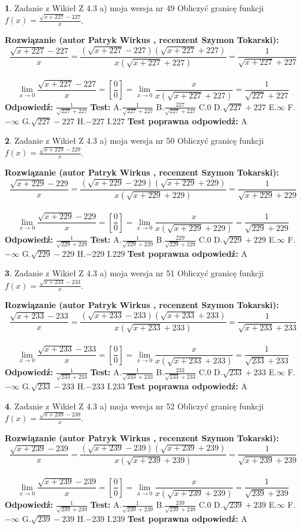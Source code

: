 \documentclass[12pt, a4paper]{article}
\theoremstyle{definition} %
\newtheorem{zad}{}
\newcommand{\zadStart}[1]{\begin{zad}#1\newline}
\newcommand{\zadStop}{\end{zad}}
\newcommand{\rozwStart}[2]{\noindent \textbf{Rozwiązanie (autor #1 , recenzent #2): }\newline}
\newcommand{\rozwStop}{\newline}
\newcommand{\odpStart}{\noindent \textbf{Odpowiedź:}\newline}
\newcommand{\odpStop}{\newline}
\newcommand{\testStart}{\noindent \textbf{Test:}\newline}
\newcommand{\testStop}{\newline}
\newcommand{\kluczStart}{\noindent \textbf{Test poprawna odpowiedź:}\newline}
\newcommand{\kluczStop}{\newline}
\begin{document}
\zadStart{Zadanie z Wikieł Z 4.3 a) moja wersja nr 49}
Obliczyć granicę funkcji $f(x)=\frac{\sqrt{x+227}-227}{x}$.
\zadStop
\rozwStart{Patryk Wirkus}{Szymon Tokarski}
$$\frac{\sqrt{x+227}-227}{x}=\frac{(\sqrt{x+227}-227)(\sqrt{x+227}+227)}{x(\sqrt{x+227}+227)}=\frac{1}{\sqrt{x+227}+227}$$
\\
$$\lim\limits_{x\to0}\frac{\sqrt{x+227}-227}{x}=[\frac{0}{0}]=
\lim\limits_{x\to0}\frac{x}{x(\sqrt{x+227}+227)} = \frac{1}{\sqrt{227}+227}$$
\rozwStop
\odpStart
$\frac{1}{\sqrt{227}+227}$
\odpStop
\testStart
A.$\frac{1}{\sqrt{227}+227}$
B.$\frac{227}{\sqrt{227}+227}$
C.$0$
D.$\sqrt{227}+227$
E.$\infty$
F.$-\infty$
G.$\sqrt{227}-227$
H.$-227$
I.$227$
\testStop
\kluczStart
A
\kluczStop



\zadStart{Zadanie z Wikieł Z 4.3 a) moja wersja nr 50}
Obliczyć granicę funkcji $f(x)=\frac{\sqrt{x+229}-229}{x}$.
\zadStop
\rozwStart{Patryk Wirkus}{Szymon Tokarski}
$$\frac{\sqrt{x+229}-229}{x}=\frac{(\sqrt{x+229}-229)(\sqrt{x+229}+229)}{x(\sqrt{x+229}+229)}=\frac{1}{\sqrt{x+229}+229}$$
\\
$$\lim\limits_{x\to0}\frac{\sqrt{x+229}-229}{x}=[\frac{0}{0}]=
\lim\limits_{x\to0}\frac{x}{x(\sqrt{x+229}+229)} = \frac{1}{\sqrt{229}+229}$$
\rozwStop
\odpStart
$\frac{1}{\sqrt{229}+229}$
\odpStop
\testStart
A.$\frac{1}{\sqrt{229}+229}$
B.$\frac{229}{\sqrt{229}+229}$
C.$0$
D.$\sqrt{229}+229$
E.$\infty$
F.$-\infty$
G.$\sqrt{229}-229$
H.$-229$
I.$229$
\testStop
\kluczStart
A
\kluczStop



\zadStart{Zadanie z Wikieł Z 4.3 a) moja wersja nr 51}
Obliczyć granicę funkcji $f(x)=\frac{\sqrt{x+233}-233}{x}$.
\zadStop
\rozwStart{Patryk Wirkus}{Szymon Tokarski}
$$\frac{\sqrt{x+233}-233}{x}=\frac{(\sqrt{x+233}-233)(\sqrt{x+233}+233)}{x(\sqrt{x+233}+233)}=\frac{1}{\sqrt{x+233}+233}$$
\\
$$\lim\limits_{x\to0}\frac{\sqrt{x+233}-233}{x}=[\frac{0}{0}]=
\lim\limits_{x\to0}\frac{x}{x(\sqrt{x+233}+233)} = \frac{1}{\sqrt{233}+233}$$
\rozwStop
\odpStart
$\frac{1}{\sqrt{233}+233}$
\odpStop
\testStart
A.$\frac{1}{\sqrt{233}+233}$
B.$\frac{233}{\sqrt{233}+233}$
C.$0$
D.$\sqrt{233}+233$
E.$\infty$
F.$-\infty$
G.$\sqrt{233}-233$
H.$-233$
I.$233$
\testStop
\kluczStart
A
\kluczStop



\zadStart{Zadanie z Wikieł Z 4.3 a) moja wersja nr 52}
Obliczyć granicę funkcji $f(x)=\frac{\sqrt{x+239}-239}{x}$.
\zadStop
\rozwStart{Patryk Wirkus}{Szymon Tokarski}
$$\frac{\sqrt{x+239}-239}{x}=\frac{(\sqrt{x+239}-239)(\sqrt{x+239}+239)}{x(\sqrt{x+239}+239)}=\frac{1}{\sqrt{x+239}+239}$$
\\
$$\lim\limits_{x\to0}\frac{\sqrt{x+239}-239}{x}=[\frac{0}{0}]=
\lim\limits_{x\to0}\frac{x}{x(\sqrt{x+239}+239)} = \frac{1}{\sqrt{239}+239}$$
\rozwStop
\odpStart
$\frac{1}{\sqrt{239}+239}$
\odpStop
\testStart
A.$\frac{1}{\sqrt{239}+239}$
B.$\frac{239}{\sqrt{239}+239}$
C.$0$
D.$\sqrt{239}+239$
E.$\infty$
F.$-\infty$
G.$\sqrt{239}-239$
H.$-239$
I.$239$
\testStop
\kluczStart
A
\kluczStop
\end{document}
